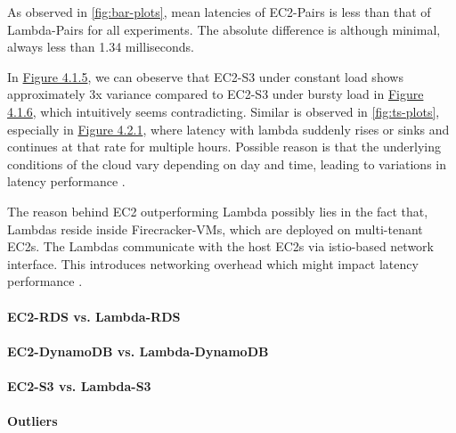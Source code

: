 As observed in \cref{fig:bar-plots}, mean latencies of EC2-Pairs is less than that of Lambda-Pairs for all experiments. The absolute difference is although minimal, always less than 1.34 milliseconds. 

In \hyperref[fig:bar_s3_const]{Figure 4.1.5}, we can obeserve that EC2-S3 under constant load shows approximately 3x variance compared to EC2-S3 under bursty load in \hyperref[fig:bar_s3_bursty]{Figure 4.1.6}, which intuitively seems contradicting. Similar is observed in \cref{fig:ts-plots}, especially in \hyperref[fig:ts_rds_const]{Figure 4.2.1}, where latency with lambda suddenly rises or sinks and continues at that rate for multiple hours. Possible reason is that the underlying conditions of the cloud vary depending on day and time, leading to variations in latency performance \cite{}.

The reason behind EC2 outperforming Lambda possibly lies in the fact that, Lambdas reside inside Firecracker-VMs, which are deployed on multi-tenant EC2s. The Lambdas communicate with the host EC2s via istio-based network interface. This introduces networking overhead which might impact latency performance \cite{}.

\paragraph*{EC2-RDS vs. Lambda-RDS}

\paragraph*{EC2-DynamoDB vs. Lambda-DynamoDB}

\paragraph*{EC2-S3 vs. Lambda-S3}

\paragraph*{Outliers}
